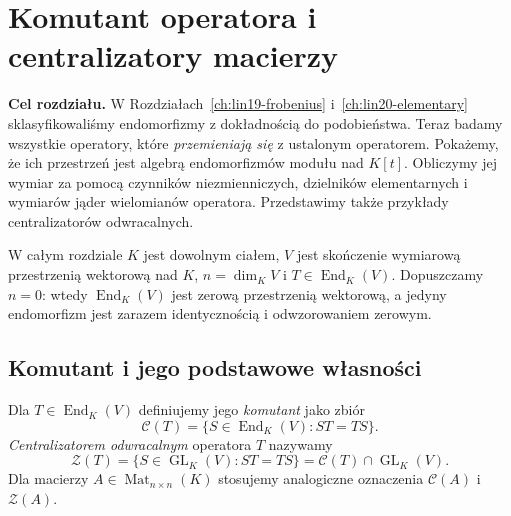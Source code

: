 \chapter{Komutant operatora i centralizatory macierzy}
\label{ch:lin21-commutant}

\providecommand{\atlasref}[2]{#2}


\noindent\textbf{Cel rozdziału.}
W Rozdziałach~\ref{ch:lin19-frobenius}
i~\ref{ch:lin20-elementary}
sklasyfikowaliśmy endomorfizmy
z dokładnością do podobieństwa.
Teraz badamy wszystkie operatory, które
\emph{przemieniają się} z ustalonym operatorem.
Pokażemy, że ich przestrzeń jest
algebrą endomorfizmów modułu nad \(K[t]\).
Obliczymy jej wymiar za pomocą
czynników niezmienniczych, dzielników
elementarnych i wymiarów jąder wielomianów
operatora. Przedstawimy także przykłady
centralizatorów odwracalnych.

W całym rozdziale \(K\) jest dowolnym
ciałem, \(V\) jest skończenie wymiarową
przestrzenią wektorową nad \(K\),
\(n=\dim_K V\) i
\(T\in\operatorname{End}_K(V)\).
Dopuszczamy \(n=0\): wtedy
\(\operatorname{End}_K(V)\) jest zerową
przestrzenią wektorową, a jedyny
endomorfizm jest zarazem identycznością
i odwzorowaniem zerowym.

\section{Komutant i jego podstawowe własności}
\label{sec:lin21-definition}

\begin{definicja}
\label{def:lin21-commutant}
Dla \(T\in\operatorname{End}_K(V)\)
definiujemy jego \emph{komutant}
jako zbiór
\[
 \mathcal C(T)
 =\{S\in\operatorname{End}_K(V):ST=TS\}.
\]
\emph{Centralizatorem odwracalnym}
operatora \(T\) nazywamy
\[
 \mathcal Z(T)
 =\{S\in\operatorname{GL}_K(V):ST=TS\}
 =\mathcal C(T)\cap\operatorname{GL}_K(V).
\]
Dla macierzy \(A\in\operatorname{Mat}_{n\times n}(K)\)
stosujemy analogiczne oznaczenia
\(\mathcal C(A)\) i \(\mathcal Z(A)\).
\end{definicja}

